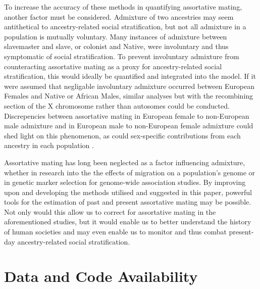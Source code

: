 \documentclass[11pt]{article}
\begin{document}
To increase the accuracy of these methods in quantifying assortative mating, another factor must be considered. Admixture of two ancestries may seem antithetical to ancestry-related social stratification, but not all admixture in a population is mutually voluntary. Many instances of admixture between slavemaster and slave, or colonist and Native, were involuntary and thus symptomatic of social stratification. To prevent involuntary admixture from counteracting assortative mating as a proxy for ancestry-related social stratification, this would ideally be quantified and integrated into the model. If it were assumed that negligable involuntary admixture occurred between European Females and Native or African Males, similar analyses but with the recombining section of the X chromosome rather than autosomes could be conducted. Discrepencies between assortative mating in European female to non-European male admixture and in European male to non-European female admixture could shed light on this phenomenon, as could sex-specific contributions from each ancestry in each population \parencite{Micheletti2020}.

Assortative mating has long been neglected as a factor influencing admixture, whether in research into the the effects of migration on a population's genome or in genetic marker selection for genome-wide association studies. By improving upon and developing the methods utilised and suggested in this paper, powerful tools for the estimation of past and present assortative mating may be possible. Not only would this allow us to correct for assortative mating in the aforementioned studies, but it would enable us to better understand the history of human societies and may even enable us to monitor and thus combat present-day ancestry-related social stratification.
















\vspace{8mm}
\section{Data and Code Availability}

\end{document}
